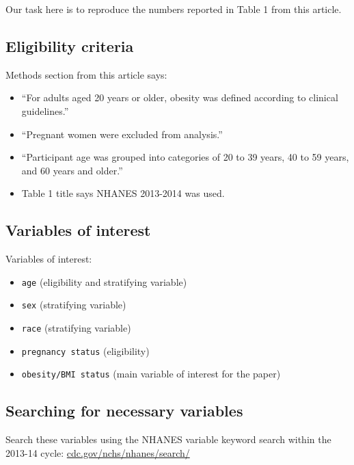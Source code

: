 \documentclass[
]{book}
\providecommand{\tightlist}{%
  \setlength{\itemsep}{0pt}\setlength{\parskip}{0pt}}
\begin{document}
Our task here is to reproduce the numbers reported in Table 1 from this article.

\hypertarget{eligibility-criteria}{%
\subsection{Eligibility criteria}\label{eligibility-criteria}}

Methods section from this article says:

\begin{itemize}
\tightlist
\item
  ``For adults aged 20 years or older, obesity was defined according to clinical guidelines.''
\item
  ``Pregnant women were excluded from analysis.''
\item
  ``Participant age was grouped into categories of 20 to 39 years, 40 to 59 years, and 60 years and older.''
\item
  Table 1 title says NHANES 2013-2014 was used.
\end{itemize}

\hypertarget{variables-of-interest}{%
\subsection{Variables of interest}\label{variables-of-interest}}

Variables of interest:

\begin{itemize}
\tightlist
\item
  \texttt{age} (eligibility and stratifying variable)
\item
  \texttt{sex} (stratifying variable)
\item
  \texttt{race} (stratifying variable)
\item
  \texttt{pregnancy\ status} (eligibility)
\item
  \texttt{obesity/BMI\ status} (main variable of interest for the paper)
\end{itemize}

\hypertarget{searching-for-necessary-variables}{%
\subsection{Searching for necessary variables}\label{searching-for-necessary-variables}}

Search these variables using the NHANES variable keyword search within the 2013-14 cycle: \href{https://wwwn.cdc.gov/nchs/nhanes/search/default.aspx}{cdc.gov/nchs/nhanes/search/}
\end{document}
